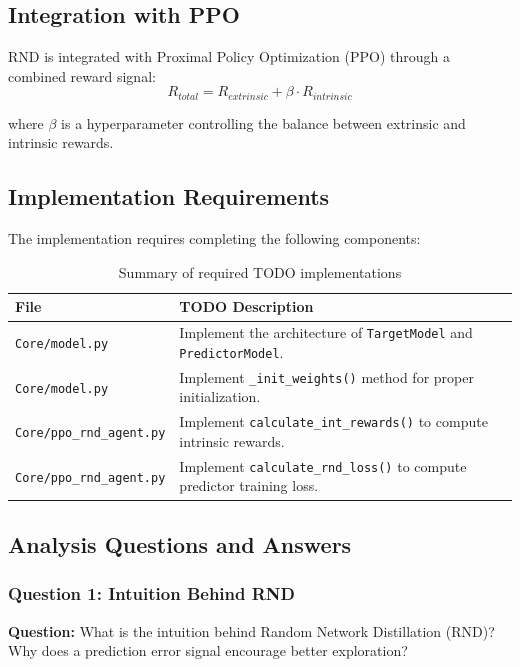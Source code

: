 \documentclass[12pt]{article}
\begin{document}
{{{\subsection{Integration with PPO}

RND is integrated with Proximal Policy Optimization (PPO) through a combined reward signal:
\begin{equation}
R_{total} = R_{extrinsic} + \beta \cdot R_{intrinsic}
\end{equation}

where $\beta$ is a hyperparameter controlling the balance between extrinsic and intrinsic rewards.

\subsection{Implementation Requirements}

The implementation requires completing the following components:

\begin{table}[H]
\centering
\renewcommand{\arraystretch}{1.3}
\begin{tabular}{ll}
\toprule
\textbf{File} & \textbf{TODO Description} \\
\midrule
\texttt{Core/model.py} & Implement the architecture of \texttt{TargetModel} and \texttt{PredictorModel}. \\
\texttt{Core/model.py} & Implement \texttt{\_init\_weights()} method for proper initialization. \\
\texttt{Core/ppo\_rnd\_agent.py} & Implement \texttt{calculate\_int\_rewards()} to compute intrinsic rewards. \\
\texttt{Core/ppo\_rnd\_agent.py} & Implement \texttt{calculate\_rnd\_loss()} to compute predictor training loss. \\
\bottomrule
\end{tabular}
\caption{Summary of required TODO implementations}
\end{table}
    
\subsection{Analysis Questions and Answers}

\subsubsection{Question 1: Intuition Behind RND}

\textbf{Question:} What is the intuition behind Random Network Distillation (RND)? Why does a prediction error signal encourage better exploration?

}}}
\end{document}
